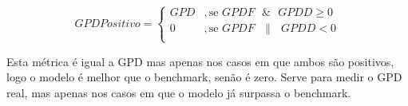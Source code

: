  \begin{equation} \label{eq:gpdpositivo} 
    GPD Positivo = 
    \begin{cases} 
        GPD & , \text{se } GPDF \text{ }\&\text{ } GPDD \geq 0 \\
        0 & , \text{se } GPDF \text{ }\|\text{ } GPDD < 0 \\
    \end{cases} 
\end{equation}
\smallskip


Esta métrica é igual a GPD mas apenas nos casos em que ambos são positivos, logo o modelo é melhor que o benchmark, senão é zero. Serve para medir o GPD real, mas apenas nos casos em que o modelo já surpassa o benchmark.\\
